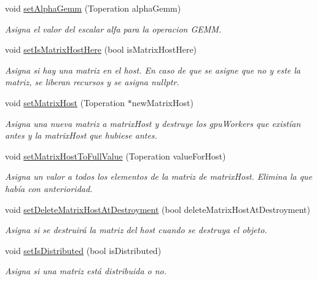 \begin{DoxyCompactItemize}
void \hyperlink{classMatrixMain_a6e67efda03cdd8e70215247b7f857002}{set\+Alpha\+Gemm} (Toperation alpha\+Gemm)
\begin{DoxyCompactList}\small\item\em Asigna el valor del escalar alfa para la operacion G\+E\+MM. \end{DoxyCompactList}\item 
void \hyperlink{classMatrixMain_a6efed0175fedf515e3356ea3c27d3d5a}{set\+Is\+Matrix\+Host\+Here} (bool is\+Matrix\+Host\+Here)
\begin{DoxyCompactList}\small\item\em Asigna si hay una matriz en el host. En caso de que se asigne que no y este la matriz, se liberan recursos y se asigna nullptr. \end{DoxyCompactList}\item 
void \hyperlink{classMatrixMain_a1cbc27697a76770978dde0e4b0edc732}{set\+Matrix\+Host} (Toperation $\ast$new\+Matrix\+Host)
\begin{DoxyCompactList}\small\item\em Asigna una nueva matriz a matrix\+Host y destruye los gpu\+Workers que existían antes y la matrix\+Host que hubiese antes. \end{DoxyCompactList}\item 
void \hyperlink{classMatrixMain_aa6fa4a668ce7857289dc0931b319429e}{set\+Matrix\+Host\+To\+Full\+Value} (Toperation value\+For\+Host)
\begin{DoxyCompactList}\small\item\em Asigna un valor a todos los elementos de la matriz de matrix\+Host. Elimina la que había con anterioridad. \end{DoxyCompactList}\item 
void \hyperlink{classMatrixMain_a9c8cf3be535a8bb042f6ee0ddaafc6b1}{set\+Delete\+Matrix\+Host\+At\+Destroyment} (bool delete\+Matrix\+Host\+At\+Destroyment)
\begin{DoxyCompactList}\small\item\em Asigna si se destruirá la matriz del host cuando se destruya el objeto. \end{DoxyCompactList}\item 
void \hyperlink{classMatrixMain_a8c00132316f5c4c39259281d8e9d3e95}{set\+Is\+Distributed} (bool is\+Distributed)
\begin{DoxyCompactList}\small\item\em Asigna si una matriz está distribuida o no. \end{DoxyCompactList}\item 

\end{DoxyCompactItemize}

